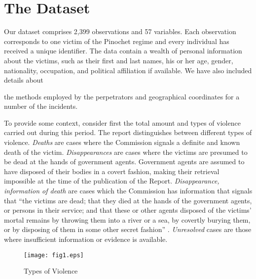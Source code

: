 \documentclass[a4paper,12pt]{article}
\begin{document}
\section{The Dataset}
\label{sec:data}

Our dataset comprises 2,399 observations and 57 variables. Each observation corresponds to one victim of the Pinochet regime and every individual has received a unique identifier. The data contain a wealth of personal information about the victims, such as their first and last names, his or her age, gender, nationality, occupation, and political affiliation if available. We have also included details about 

the methods employed by the perpetrators and geographical coordinates for a number of the incidents.

To provide some context, consider first the total amount and types of violence carried out during this period. The report distinguishes between different types of violence. \textit{Deaths} are cases where the Commission signals a definite and known death of the victim. \textit{Disappearances} are cases where the victims are presumed to be dead at the hands of government agents. Government agents are assumed to have disposed of their bodies in a covert fashion, making their retrieval impossible at the time of the publication of the Report. \textit{Disappearance, information of death} are cases which the Commission has information that signals that ``the victims are dead; that they died at the hands of the government agents, or persons in their service; and that these or other agents disposed of the victims' mortal remains by throwing them into a river or a sea, by covertly burying them, or by disposing of them in some other secret fashion'' 
\citep[44]{report1991}. \textit{Unresolved} cases are those where insufficient information or evidence is available.

\begin{figure}[ht!]
    \centering
    \texttt{[image: fig1.eps]}
    \caption{Types of Violence}
    \label{fig:number-victims}
\end{figure}

\end{document}
